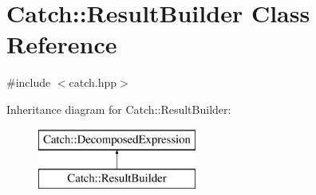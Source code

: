 \hypertarget{class_catch_1_1_result_builder}{}\section{Catch\+:\+:Result\+Builder Class Reference}
\label{class_catch_1_1_result_builder}


{\ttfamily \#include $<$catch.\+hpp$>$}

Inheritance diagram for Catch\+:\+:Result\+Builder\+:\begin{figure}[H]
\begin{center}
\leavevmode
\includegraphics[height=2.000000cm]{class_catch_1_1_result_builder}
\end{center}
\end{figure}
